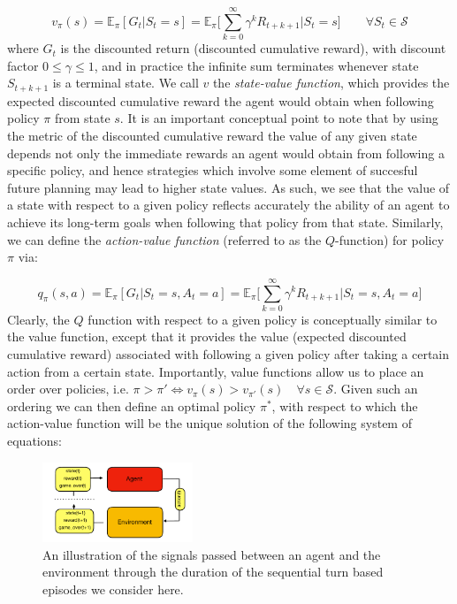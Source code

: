 \documentclass[twocolumn,preprintnumbers,amsmath,amssymb,notitlepage,nofootinbib,longbibliography,superscriptaddress,aps,pra,10pt]{revtex4-1}
\begin{document}
    \begin{equation}
        v_{\pi}(s) = \mathbb{E}_{\pi}[G_t|S_t = s]  = \mathbb{E}_{\pi} \Big[\sum_{k = 0}^{\infty}\gamma^k R_{t+k+1}\Big| S_t = s \Big] \qquad \forall S_t \in \mathcal{S}
    \end{equation}
    where $G_t$ is the discounted return (discounted cumulative reward), with discount factor $0 \leq \gamma \leq 1$, and in practice the infinite sum terminates whenever state $S_{t+k+1}$ is a terminal state. We call $v$ the \textit{state-value function}, which provides the expected discounted cumulative reward the agent would obtain when following policy $\pi$ from state $s$. It is an important conceptual point to note that by using the metric of the discounted cumulative reward the value of any given state depends not only the immediate rewards an agent would obtain from following a specific policy, and hence strategies which involve some element of succesful future planning may lead to higher state values. As such, we see that the value of a state with respect to a given policy reflects accurately the ability of an agent to achieve its long-term goals when following that policy from that state. Similarly, we can define the \textit{action-value function}  (referred to as the $Q$-function) for policy $\pi$ via:

    \begin{equation}
        q_{\pi}(s,a) = \mathbb{E}_{\pi}[G_t|S_t = s, A_t = a]  = \mathbb{E}_{\pi} \Big[\sum_{k = 0}^{\infty}\gamma^k R_{t+k+1}\Big| S_t = s, A_t = a \Big]
    \end{equation}
    Clearly, the $Q$ function with respect to a given policy is conceptually similar to the value function, except that it provides the value (expected discounted cumulative reward) associated with following a given policy after taking a certain action from a certain state. Importantly, value functions allow us to place an order over policies, i.e. $\pi > \pi' \iff v_{\pi}(s) > v_{\pi'}(s)\quad \forall s \in \mathcal{S} $. Given such an ordering we can then define an optimal policy $\pi^*$, with respect to which the action-value function will be the unique solution of the following system of equations:

    \begin{figure}
      \centering
          \includegraphics[width=0.4\textwidth]{figures/agent_environment.pdf}
      \caption{An illustration of the signals passed between an agent and the environment through the duration of the sequential turn based episodes we consider here.}\label{f:agent_environment}
    \end{figure}
\end{document}
